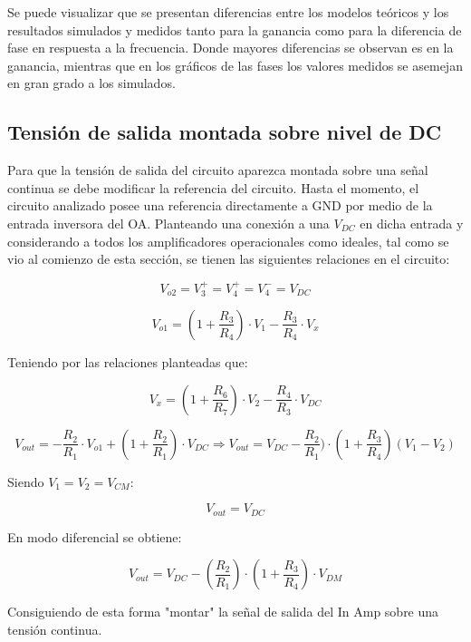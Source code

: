 Se puede visualizar que se presentan diferencias entre los modelos teóricos y los resultados simulados y medidos tanto para la ganancia como para la diferencia de fase en respuesta a la frecuencia.
Donde mayores diferencias se observan es en la ganancia, mientras que en los gráficos de las fases los valores medidos se asemejan en gran grado a los simulados.

\subsection{Tensión de salida montada sobre nivel de DC}

Para que la tensión de salida del circuito aparezca montada sobre una señal continua se debe modificar la referencia del circuito. Hasta el momento, el circuito analizado posee una referencia directamente
a GND por medio de la entrada inversora del OA. Planteando una conexión a una $V_{DC}$ en dicha entrada y considerando a todos los amplificadores operacionales como ideales, tal como se vio al comienzo 
de esta sección, se tienen las siguientes relaciones en el circuito:

$$V_{o2}=V^{+}_{3}=V^{+}_{4}=V^{-}_{4} = V_{DC}$$

$$V_{o1} = \left(1+\frac{R_3}{R_4}\right)\cdot V_{1}  - \frac{R_3}{R_4}\cdot V_x$$

Teniendo por las relaciones planteadas que:

$$V_x = (1+\frac{R_6}{R_7}) \cdot V_2 - \frac{R_4}{R_3}\cdot V_{DC}$$
              
$$V_{out} = -\frac{R_{2}}{R_{1}}\cdot V_{o1} + (1+\frac{R_2}{R_1}) \cdot V_{DC} \Rightarrow V_{out} = V_{DC} - \frac{R_2}{R_1})\cdot (1+\frac{R_3}{R_4}) (V_{1}-V_{2})$$

Siendo $V_{1}=V_{2}=V_{CM}$:

$$V_{out} = V_{DC}$$

En modo diferencial se obtiene:

$$V_{out} = V_{DC} - (\frac{R_2}{R_1})\cdot (1+\frac{R_3}{R_4})\cdot V_{DM}$$

Consiguiendo de esta forma "montar" la señal de salida del In Amp sobre una tensión continua. 



